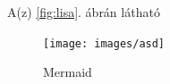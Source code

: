 \documentclass[12pt, twoside]{report}
\begin{document}
  \begin{markdown}
  A(z) \ref{fig:lisa}. ábrán látható
  \end{markdown}

  \begin{figure}
    \centering
    \texttt{[image: images/asd]}
    \caption{Mermaid}
    \label{fig:mermaid}
  \end{figure}


%
\end{document}
